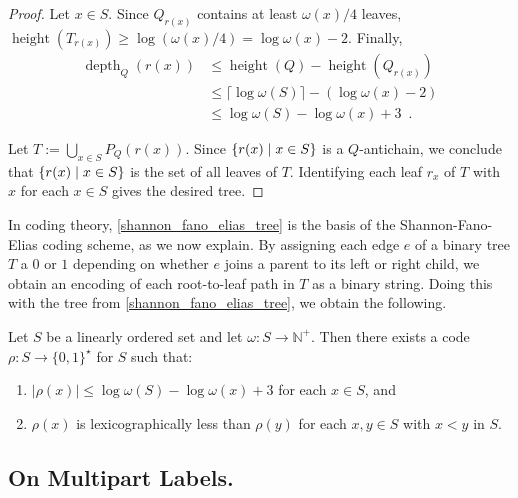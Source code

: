 \documentclass[twoside,leqno]{article}
\newcommand{\N}{\mathbb{N}}
\renewcommand{\le}{\leqslant}
\renewcommand{\geq}{\geqslant}
\DeclareMathOperator{\height}{height}
\DeclareMathOperator{\depth}{depth}
\DeclarePairedDelimiter{\set}{\{}{\}}
\begin{document}
\begin{proof}
  Let $x\in S$. Since $Q_{r(x)}$ contains at least $\omega(x)/4$ leaves, $\height(T_{r(x)}) \geq \log(\omega(x)/4) = \log\omega(x) - 2$. Finally,
  \begin{align*}
    \depth_Q(r(x))
     & \le \height(Q)-\height(Q_{r(x)})                    \\
     & \le \lceil\log\omega(S)\rceil - (\log\omega(x) - 2) \\
     & \le \log\omega(S) - \log\omega(x) +3 \enspace.
  \end{align*}

  Let $T:=\bigcup_{x\in S} P_Q(r(x))$.
  Since $\set{r(x) \mid x\in S}$ is a $Q$-antichain,
  we conclude that $\set{r(x)\mid x\in S}$ is the set of all leaves of $T$.
  Identifying each leaf $r_x$ of $T$ with $x$ for each $x\in S$ gives the desired tree.
\end{proof}

In coding theory, \cref{shannon_fano_elias_tree} is the basis of the Shannon-Fano-Elias coding scheme, as we now explain.  By assigning each edge $e$ of a binary tree $T$ a $0$ or $1$ depending on whether $e$ joins a parent to its left or right child, we obtain an encoding of each root-to-leaf path in $T$ as a binary string. Doing this with the tree from \cref{shannon_fano_elias_tree}, we obtain the following.

\begin{cor}\label{shannon_fano_elias_code}
  Let $S$ be a linearly ordered set and let $\omega:S\to\N^+$.  Then there exists a code $\rho:S\to \{0,1\}^\star$ for $S$ such that:
  \begin{enumerate}[nosep,nolistsep,label=(\alph*)]
    \item $|\rho(x)|\le \log\omega(S) - \log\omega(x)+3$ for each $x\in S$, and
    \item $\rho(x)$ is lexicographically less than $\rho(y)$ for each $x,y\in S$ with $x< y$ in $S$.
  \end{enumerate}
\end{cor}

\subsection{On Multipart Labels.}
\label{multipart}
\end{document}
